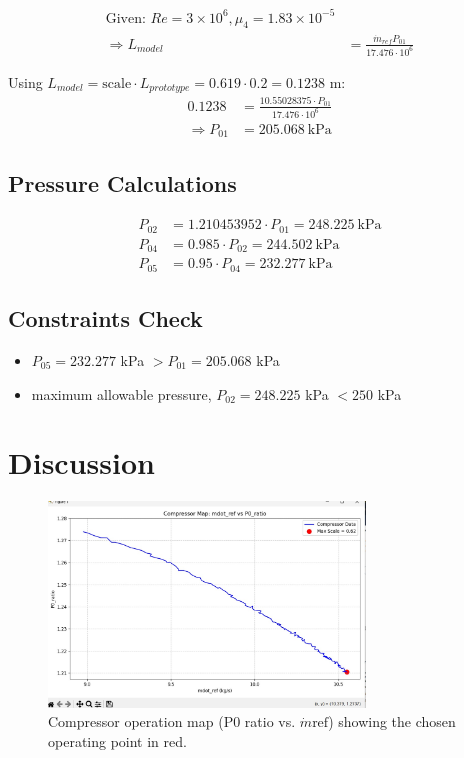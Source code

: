 \documentclass[12pt,a4paper]{article}
\begin{document}
\begin{align*}
\text{Given: } Re = 3 \times 10^6, \mu_4 = 1.83 \times 10^{-5} \\
\Rightarrow L_{model} &= \frac{\dot{m}_{ref} P_{01}}{17.476 \cdot 10^6}
\end{align*}

Using $L_{model} = \text{scale} \cdot L_{prototype} = 0.619 \cdot 0.2 = 0.1238$ m:
\begin{align*}
0.1238 &= \frac{10.55028375 \cdot P_{01}}{17.476 \cdot 10^6} \\
\Rightarrow P_{01} &= 205.068~\text{kPa} \tag{12}
\end{align*}

\subsection*{Pressure Calculations}
\begin{align*}
P_{02} &= 1.210453952 \cdot P_{01} = 248.225~\text{kPa} \tag{13} \\
P_{04} &= 0.985 \cdot P_{02} = 244.502~\text{kPa} \\
P_{05} &= 0.95 \cdot P_{04} = 232.277~\text{kPa}
\end{align*}

\subsection*{Constraints Check}
\begin{itemize}
  \item $P_{05} = 232.277$ kPa $> P_{01} = 205.068$ kPa \hfill \
  \item maximum allowable pressure, $P_{02} = 248.225$ kPa $< 250$ kPa \hfill \
\end{itemize}

\section*{Discussion}

\begin{figure}[h!]
    \centering
    \includegraphics[width=0.75\textwidth]{Compressor Map mdot_ref vs P0_ratio.jpg}
    \caption{Compressor operation map (P\(0\) ratio vs. \(\dot{m}{\text{ref}}\)) showing the 
    chosen operating point in red.}
    \label{fig:comp_map}
\end{figure}
\end{document}
